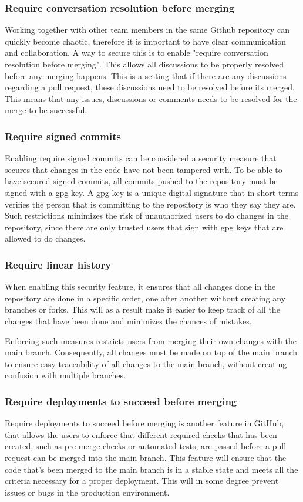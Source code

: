 \subsubsection{Require conversation resolution before merging}
Working together with other team members in the same Github repository can quickly become chaotic, therefore it is important to have clear communication and collaboration. A way to secure this is to enable "require conversation resolution before merging". This allows all discussions to be properly resolved before any merging happens. This is a setting that if there are any discussions regarding a pull request, these discussions need to be resolved before its merged. This means that any issues, discussions or comments needs to be resolved for the merge to be successful. 
\\
\subsubsection{Require signed commits}
Enabling require signed commits can be considered a security measure that secures that changes in the code have not been tampered with. 
To be able to have secured signed commits, all commits pushed to the repository must be signed with a \acrlong{gpg} key. A \acrshort{gpg} key is  a unique digital signature that in short terms verifies the person that is committing to the repository is who they say they are. 
Such restrictions minimizes the risk of unauthorized users to do changes in the repository, since there are only trusted users that sign with \acrshort{gpg} keys that are allowed to do changes. 

\subsubsection{Require linear history}
When enabling this security feature, it ensures that all changes done in the repository are done in a specific order, one after another without creating any branches or forks. This will as a result make it easier to keep track of all the changes that have been done and minimizes the chances of mistakes. 

Enforcing such measures restricts users from merging their own changes with the main branch. Consequently, all changes must be made on top of the main branch to ensure easy traceability of all changes to the main branch, without creating confusion with multiple branches.
\newpage

\subsubsection{Require deployments to succeed before merging}
Require deployments to succeed before merging is another feature in GitHub, that allows the users to enforce that different required checks that has been created, such as pre-merge checks or automated tests, are passed before a pull request can be merged into the main branch. This feature will ensure that the code that's been merged to the main branch is in a stable state and meets all the criteria necessary for a proper deployment. This will in some degree prevent issues or bugs in the production environment. 

